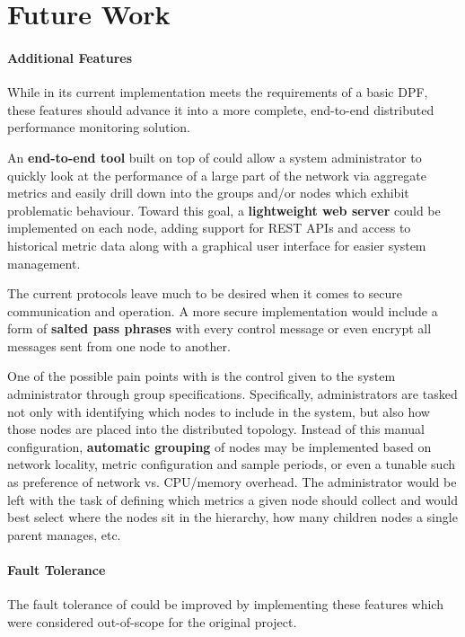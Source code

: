 \chapter{Future Work}
\label{future_work}

\subsubsection{Additional Features}

While \dcamp in its current implementation meets the requirements of a basic DPF, these features should advance it into
a more complete, end-to-end distributed performance monitoring solution.

An \textbf{end-to-end tool} built on top of \dcamp could allow a system administrator to quickly look at the performance
of a large part of the network via aggregate metrics and easily drill down into the groups and/or nodes which exhibit
problematic behaviour. Toward this goal, a \textbf{lightweight web server} could be implemented on each node, adding
support for REST APIs and access to historical metric data along with a graphical user interface for easier \dcamp
system management.

The current \dcamp protocols leave much to be desired when it comes to secure communication and operation. A more secure
implementation would include a form of \textbf{salted pass phrases} with every control message or even encrypt all
messages sent from one node to another.

One of the possible pain points with \dcamp is the control given to the system administrator through group
specifications. Specifically, administrators are tasked not only with identifying which nodes to include in the system,
but also how those nodes are placed into the distributed topology. Instead of this manual configuration,
\textbf{automatic grouping} of nodes may be implemented based on network locality, metric configuration and sample
periods, or even a tunable such as preference of network vs. CPU/memory overhead. The administrator would be left with
the task of defining which metrics a given node should collect and \dcamp would best select where the nodes sit in the
hierarchy, how many children nodes a single parent manages, etc.

\subsubsection{Fault Tolerance}

The fault tolerance of \dcamp could be improved by implementing these features which were considered out-of-scope for
the original project.

